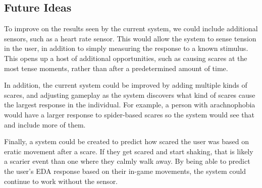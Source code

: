 \documentclass[12pt,a4paper]{article}
\begin{document}
\subsection{Future Ideas}
To improve on the results seen by the current system, we could include additional sensors, such as a heart rate sensor. This would allow the system to sense tension in the user, in addition to simply measuring the response to a known stimulus. This opens up a host of additional opportunities, such as causing scares at the most tense moments, rather than after a predetermined amount of time.

In addition, the current system could be improved by adding multiple kinds of scares, and adjusting gameplay as the system discovers what kind of scares cause the largest response in the individual. For example, a person with arachnophobia would have a larger response to spider-based scares so the system would see that and include more of them.

Finally, a system could be created to predict how scared the user was based on eratic movement after a scare. If they get scared and start shaking, that is likely a scarier event than one where they calmly walk away. By being able to predict the user's EDA response based on their in-game movements, the system could continue to work without the sensor.




\end{document}
